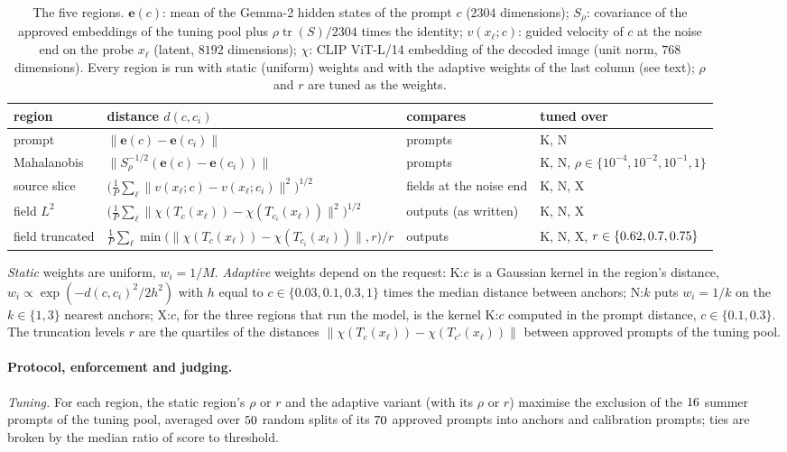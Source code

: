\documentclass{article}
\newcommand{\be}{\mathbf{e}}
\begin{document}
\begin{table}[!htbp]
\centering
\caption{The five regions. $\be(c)$: mean of the Gemma-2 hidden states of the prompt $c$ ($2304$ dimensions); $S_\rho$: covariance
of the approved embeddings of the tuning pool plus $\rho\operatorname{tr}(S)/2304$ times the identity; $v(x_\ell;c)$: guided velocity
of $c$ at the noise end on the probe $x_\ell$ (latent, $8192$ dimensions); $\chi$: CLIP ViT-L/14 embedding of the decoded image (unit
norm, $768$ dimensions). Every region is run with static (uniform) weights and with the adaptive weights of the last column (see
text); $\rho$ and $r$ are tuned as the weights.}
\label{tab:regions}
\small
\setlength{\tabcolsep}{4pt}
\begin{tabular}{l l l l}
\toprule
region & distance $d(c,c_i)$ & compares & tuned over \\
\midrule
prompt & $\|\be(c)-\be(c_i)\|$ & prompts & K, N \\
Mahalanobis & $\|S_\rho^{-1/2}(\be(c)-\be(c_i))\|$ & prompts & K, N, $\rho\in\{10^{-4},10^{-2},10^{-1},1\}$ \\
source slice & $\big(\frac1P\sum_\ell\|v(x_\ell;c)-v(x_\ell;c_i)\|^2\big)^{1/2}$ & fields at the noise end & K, N, X \\
field $L^2$ & $\big(\frac1P\sum_\ell\|\chi(T_c(x_\ell))-\chi(T_{c_i}(x_\ell))\|^2\big)^{1/2}$ & outputs (as written) & K, N, X \\
field truncated & $\frac1P\sum_\ell\min\big(\|\chi(T_c(x_\ell))-\chi(T_{c_i}(x_\ell))\|,r\big)/r$ & outputs & K, N, X, $r\in\{0.62, 0.7, 0.75\}$ \\
\bottomrule
\end{tabular}
\end{table}

\emph{Static} weights are uniform, $w_i=1/M$. \emph{Adaptive} weights depend on the request: K:$c$ is a Gaussian kernel in the
region's distance, $w_i\propto\exp(-d(c,c_i)^2/2h^2)$ with $h$ equal to $c\in\{0.03,0.1,0.3,1\}$ times the median distance between
anchors; N:$k$ puts $w_i=1/k$ on the $k\in\{1,3\}$ nearest anchors; X:$c$, for the three regions that run the model, is the kernel
K:$c$ computed in the prompt distance, $c\in\{0.1,0.3\}$. The truncation levels $r$ are the quartiles of the distances
$\|\chi(T_c(x_\ell))-\chi(T_{c'}(x_\ell))\|$ between approved prompts of the tuning pool.

\paragraph{Protocol, enforcement and judging.}
\emph{Tuning.} For each region, the static region's $\rho$ or $r$ and the adaptive variant (with its $\rho$ or $r$)
maximise the exclusion of the $16$ summer prompts of the tuning pool, averaged over $50$ random splits of its
$70$ approved prompts into anchors and calibration prompts; ties are broken by the median ratio of score to threshold.
\end{document}
